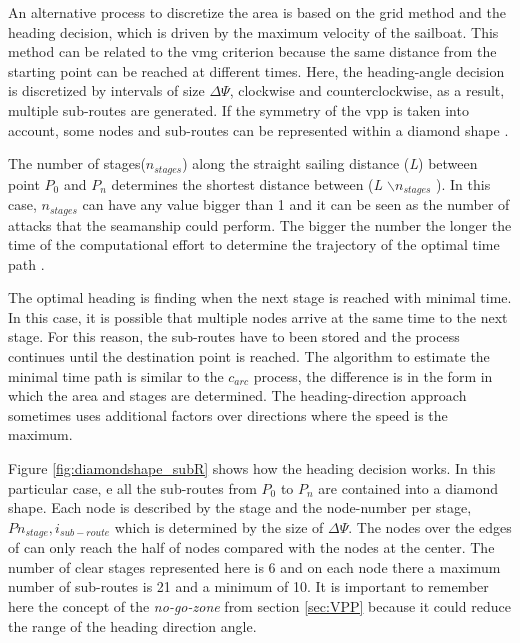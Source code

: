 An alternative process to discretize the area is based on the grid method and the heading decision, which is driven by the maximum velocity of the sailboat. This method can be related to the \acrshort{vmg} criterion because the same distance from the starting point can be reached at different times. Here, the heading-angle decision is discretized by intervals of size $\Delta \Psi$, clockwise and counterclockwise, as a result, multiple sub-routes are generated. If the symmetry of the \acrshort{vpp} is taken into account, some nodes and sub-routes can be represented within a diamond shape \cite{xing2012path} \cite{zyczkowski2017method}. \par \noindent
The number of stages($n_{stages}$) along the straight sailing distance (\textit{L}) between point $P_{0}$ and $P_{n}$ determines the shortest distance between (\textit{L} $\backslash n_{stages}$ ). In this case, $n_{stages}$ can have any value bigger than 1 and it can be seen as the number of attacks that the seamanship could perform. The bigger the number the longer the time of the computational effort to determine the trajectory of the optimal time path \cite{xing2012path}. \par 
\noindent
The optimal heading is finding when the next stage is reached with minimal time. In this case, it is possible that multiple nodes arrive at the same time to the next stage. For this reason, the sub-routes have to been stored and the process continues until the destination point is reached. The algorithm to estimate the minimal time path is similar to the $c_{arc}$ process, the difference is in the form in which the area and stages are determined. The heading-direction approach sometimes uses additional factors over directions where the speed is the maximum. \par

Figure \ref{fig:diamondshape_subR} shows how the heading decision works. In this particular case, e all the sub-routes from $P_{0}$ to $P_{n}$ are contained into a diamond shape. Each node is described by the stage and the node-number per stage, $P n_{stage},i_{sub-route}$ which is determined by the size of $\Delta \Psi$. The nodes over the edges of can only reach the half of nodes compared with the nodes at the center. The number of clear stages represented here is 6 and on each node there a maximum number of sub-routes is 21 and a minimum of 10. It is important to remember here the concept of the \textit{no-go-zone} from section \ref{sec:VPP} because it could reduce the range of the heading direction angle.\par 


